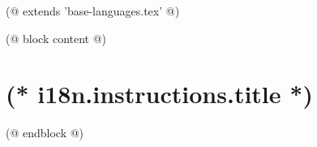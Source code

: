 (@ extends 'base-languages.tex' @)

(@ block content @)
    \pagestyle{instructions}
    \section{(* i18n.instructions.title *)}
    
(@ endblock @)
